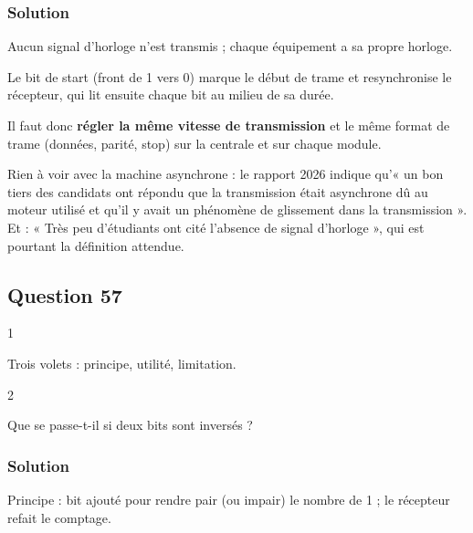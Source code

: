 \documentclass[11pt,a4paper]{article}
\begin{document}
\hypertarget{solution-55}{%
\subsubsection{Solution}\label{solution-55}}

Aucun signal d'horloge n'est transmis ; chaque équipement a sa propre horloge.

Le bit de start (front de 1 vers 0) marque le début de trame et resynchronise le récepteur, qui lit ensuite chaque bit au milieu de sa durée.

Il faut donc \textbf{régler la même vitesse de transmission} et le même format de trame (données, parité, stop) sur la centrale et sur chaque module.

\begin{piege}

Rien à voir avec la machine asynchrone : le rapport 2026 indique qu'« un bon tiers des candidats ont répondu que la transmission était asynchrone dû au moteur utilisé et qu'il y avait un phénomène de glissement dans la transmission ». Et : « Très peu d'étudiants ont cité l'absence de signal d'horloge », qui est pourtant la définition attendue.

\end{piege}

\hypertarget{question-57}{%
\subsection{Question 57}\label{question-57}}

\begin{indication}{1}

Trois volets : principe, utilité, limitation.

\end{indication}

\begin{indication}{2}

Que se passe-t-il si deux bits sont inversés ?

\end{indication}

\hypertarget{solution-56}{%
\subsubsection{Solution}\label{solution-56}}

Principe : bit ajouté pour rendre pair (ou impair) le nombre de 1 ; le récepteur refait le comptage.
\end{document}
